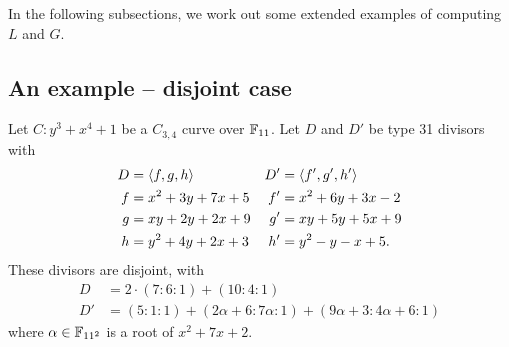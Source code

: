 In the following subsections, we work out some extended examples of computing $L$ and $G$.


\subsection{An example -- disjoint case}

Let $C : y^3 + x^4 + 1$ be a $C_{3,4}$ curve over $\mathbb{F}_{11}$.
Let $D$ and $D'$ be type 31 divisors with
\begin{align*}
  D  &= \left\langle f, g, h \right\rangle     & D' &= \left\langle f', g', h' \right\rangle \\
  f  &= x^2 + 3y + 7x + 5 & f' &= x^2 + 6y + 3x - 2 \\
  g  &= xy + 2y + 2x + 9  & g' &= xy + 5y + 5x + 9 \\
  h  &= y^2 + 4y + 2x + 3 & h' &= y^2 - y - x + 5.
\end{align*}
These divisors are disjoint, with
\begin{align*}
  D &= 2 \cdot (7 : 6 : 1) + (10 : 4 : 1) \\
  D' &= (5 : 1 : 1) + (2\alpha + 6 : 7\alpha : 1) + (9\alpha + 3 : 4\alpha + 6 : 1)
\end{align*}
where $\alpha \in \mathbb{F}_{11^2}$ is a root of $x^2 + 7x + 2$.

